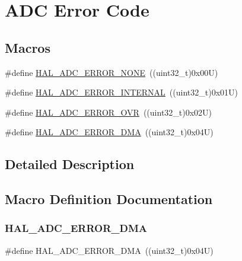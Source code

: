 \hypertarget{group___a_d_c___error___code}{}\section{A\+DC Error Code}
\label{group___a_d_c___error___code}
\subsection*{Macros}
\begin{DoxyCompactItemize}
\item 
\#define \mbox{\hyperlink{group___a_d_c___error___code_ga93b4576d46ee0f8c53b7d69f39778e38}{H\+A\+L\+\_\+\+A\+D\+C\+\_\+\+E\+R\+R\+O\+R\+\_\+\+N\+O\+NE}}~((uint32\+\_\+t)0x00\+U)
\item 
\#define \mbox{\hyperlink{group___a_d_c___error___code_ga7182f9ffc028f217db8724c7bc348f2f}{H\+A\+L\+\_\+\+A\+D\+C\+\_\+\+E\+R\+R\+O\+R\+\_\+\+I\+N\+T\+E\+R\+N\+AL}}~((uint32\+\_\+t)0x01\+U)
\item 
\#define \mbox{\hyperlink{group___a_d_c___error___code_ga30ce24556ebd3c0341558c700a3b9add}{H\+A\+L\+\_\+\+A\+D\+C\+\_\+\+E\+R\+R\+O\+R\+\_\+\+O\+VR}}~((uint32\+\_\+t)0x02\+U)
\item 
\#define \mbox{\hyperlink{group___a_d_c___error___code_gaea82628f53a8e30db3f3426922acf60f}{H\+A\+L\+\_\+\+A\+D\+C\+\_\+\+E\+R\+R\+O\+R\+\_\+\+D\+MA}}~((uint32\+\_\+t)0x04\+U)
\end{DoxyCompactItemize}


\subsection{Detailed Description}


\subsection{Macro Definition Documentation}
\mbox{\label{group___a_d_c___error___code_gaea82628f53a8e30db3f3426922acf60f}} 
\subsubsection{\texorpdfstring{HAL\_ADC\_ERROR\_DMA}{HAL\_ADC\_ERROR\_DMA}}
{\footnotesize\ttfamily \#define H\+A\+L\+\_\+\+A\+D\+C\+\_\+\+E\+R\+R\+O\+R\+\_\+\+D\+MA~((uint32\+\_\+t)0x04\+U)}

